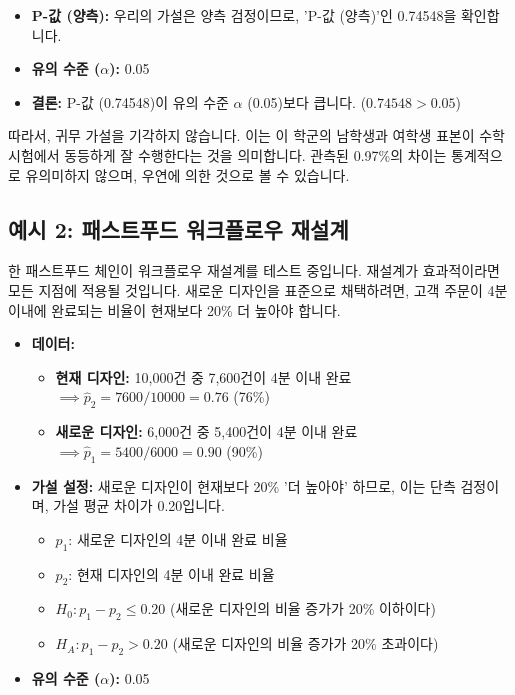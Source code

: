 \documentclass[11pt,a4paper]{article}
\theoremstyle{definition}
\begin{document}
\begin{itemize}
    \item \textbf{P-값 (양측):} 우리의 가설은 양측 검정이므로, 'P-값 (양측)'인 0.74548을 확인합니다.
    \item \textbf{유의 수준 ($\alpha$):} 0.05
    \item \textbf{결론:} P-값 (0.74548)이 유의 수준 $\alpha$ (0.05)보다 큽니다. ($0.74548 > 0.05$)
\end{itemize}
따라서, 귀무 가설을 기각하지 않습니다. 이는 이 학군의 남학생과 여학생 표본이 수학 시험에서 동등하게 잘 수행한다는 것을 의미합니다. 관측된 0.97\%의 차이는 통계적으로 유의미하지 않으며, 우연에 의한 것으로 볼 수 있습니다.

\subsection{예시 2: 패스트푸드 워크플로우 재설계}
\begin{examplebox}[title=시나리오:]
한 패스트푸드 체인이 워크플로우 재설계를 테스트 중입니다. 재설계가 효과적이라면 모든 지점에 적용될 것입니다. 새로운 디자인을 표준으로 채택하려면, 고객 주문이 4분 이내에 완료되는 비율이 현재보다 20\% 더 높아야 합니다.
\end{examplebox}

\begin{itemize}
    \item \textbf{데이터:}
    \begin{itemize}
        \item \textbf{현재 디자인:} 10,000건 중 7,600건이 4분 이내 완료 $\implies \hat{p}_2 = 7600/10000 = 0.76$ (76\%)
        \item \textbf{새로운 디자인:} 6,000건 중 5,400건이 4분 이내 완료 $\implies \hat{p}_1 = 5400/6000 = 0.90$ (90\%)
    \end{itemize}
    \item \textbf{가설 설정:} 새로운 디자인이 현재보다 20\% '더 높아야' 하므로, 이는 단측 검정이며, 가설 평균 차이가 0.20입니다.
    \begin{itemize}
        \item $p_1$: 새로운 디자인의 4분 이내 완료 비율
        \item $p_2$: 현재 디자인의 4분 이내 완료 비율
        \item $H_0: p_1 - p_2 \le 0.20$ (새로운 디자인의 비율 증가가 20\% 이하이다)
        \item $H_A: p_1 - p_2 > 0.20$ (새로운 디자인의 비율 증가가 20\% 초과이다)
    \end{itemize}
    \item \textbf{유의 수준 ($\alpha$):} 0.05
\end{itemize}
\end{document}
